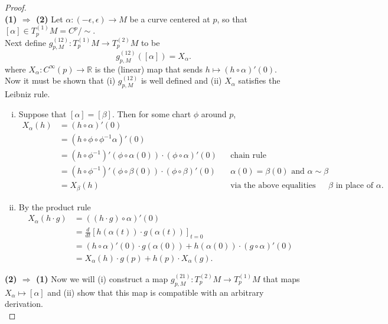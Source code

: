 \documentclass{article}
\begin{document}
\begin{proof} \text{}\\
  \textbf{(1) $\Longrightarrow$ (2)}
  Let $\alpha: (-\epsilon, \epsilon) \rightarrow M$ be a curve centered at $p$,
  so that $[\alpha] \in T_p^{(1)}M = C^p/\sim$.\\
  Next define $g_{p,M}^{(12)}\colon T_p^{(1)}M \rightarrow T_p^{(2)}M$ to be
  \[
    g_{p,M}^{(12)}([\alpha]) = X_\alpha.
  \] where $X_\alpha\colon C^\infty(p) \rightarrow \mathbb{R}$ is the (linear)
  map that sends $h \mapsto (h \circ \alpha)'(0)$.\\
  Now it must be shown that
    (i) $g_{p,M}^{(12)}$ is well defined and
    (ii) $X_\alpha$ satisfies the Leibniz rule.
  \begin{enumerate}[(i)]
  \item
    Suppose that $[\alpha] = [\beta]$. Then for some chart $\phi$ around $p$,
    \begin{align*}
      X_\alpha(h) &= (h \circ \alpha)'(0) \\
      &= (h \circ \phi \circ \phi^{-1} \alpha)'(0) \\
      &= (h \circ \phi^{-1})'(\phi\circ\alpha(0)) \cdot (\phi \circ \alpha)'(0) && \text{chain rule}\\
      &= (h \circ \phi^{-1})'(\phi\circ\beta(0)) \cdot (\phi \circ \beta)'(0) && \alpha(0) = \beta(0)\text{ and }\alpha \sim \beta\\
      &= X_\beta(h) && \text{via the above equalities with }\beta\text{ in place of }\alpha.
    \end{align*}
  \item
    By the product rule \begin{align*}
      X_\alpha(h\cdot g) &= ((h\cdot g) \circ \alpha)'(0) \\
      &= \frac{d}{dt}\left[h(\alpha(t))\cdot g(\alpha(t))\right]_{t=0}\\
      &= (h \circ \alpha)'(0)\cdot g(\alpha(0)) + h(\alpha(0)) \cdot (g \circ \alpha)'(0)\\
      &= X_\alpha(h)\cdot g(p) + h(p)\cdot X_\alpha(g).
    \end{align*}
  \end{enumerate}
  \textbf{(2) $\Longrightarrow$ (1)} Now we will (i) construct a map
  $g_{p,M}^{(21)}\colon T_p^{(2)}M \rightarrow T_p^{(1)}M$ that maps
  $X_\alpha \mapsto [\alpha]$ and (ii) show that this map is
  compatible with an arbitrary derivation.\\

\end{proof}
\end{document}
